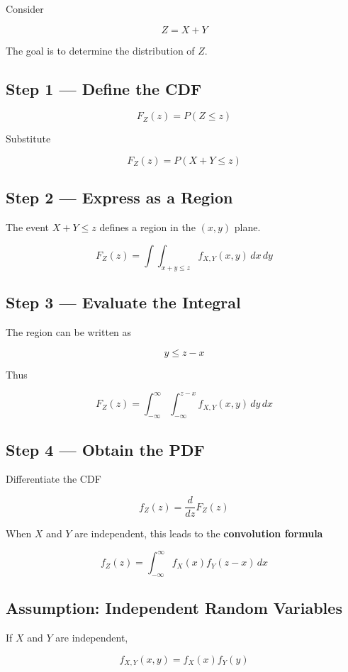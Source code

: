 \documentclass[12pt]{article}
\begin{document}
Consider

\[
Z = X + Y
\]

The goal is to determine the distribution of $Z$.

\subsection{Step 1 --- Define the CDF}

\[
F_Z(z) = P(Z \le z)
\]

Substitute

\[
F_Z(z) = P(X + Y \le z)
\]

\subsection{Step 2 --- Express as a Region}

The event $X+Y\le z$ defines a region in the $(x,y)$ plane.

\[
F_Z(z) =
\int\int_{x+y \le z}
f_{X,Y}(x,y)\,dx\,dy
\]

\subsection{Step 3 --- Evaluate the Integral}

The region can be written as

\[
y \le z - x
\]

Thus

\[
F_Z(z)=
\int_{-\infty}^{\infty}
\int_{-\infty}^{z-x}
f_{X,Y}(x,y)\,dy\,dx
\]

\subsection{Step 4 --- Obtain the PDF}

Differentiate the CDF

\[
f_Z(z)=\frac{d}{dz}F_Z(z)
\]

When $X$ and $Y$ are independent, this leads to the \textbf{convolution formula}

\[
f_Z(z) =
\int_{-\infty}^{\infty}
f_X(x)f_Y(z-x)\,dx
\]

\subsection{Assumption: Independent Random Variables}

If $X$ and $Y$ are independent,

\[
f_{X,Y}(x,y)=f_X(x)f_Y(y)
\]
\end{document}
